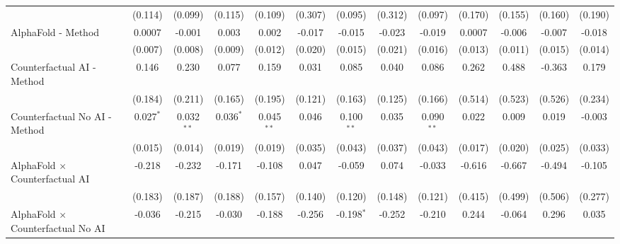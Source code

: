 \begin{tabular}{lcccccccccccc}
                                                              & (0.114)     & (0.099)      & (0.115)     & (0.109)      & (0.307)       & (0.095)       & (0.312)       & (0.097)       & (0.170) & (0.155) & (0.160) & (0.190)\\   
   AlphaFold - Method                                         & 0.0007      & -0.001       & 0.003       & 0.002        & -0.017        & -0.015        & -0.023        & -0.019        & 0.0007  & -0.006  & -0.007  & -0.018\\   
                                                              & (0.007)     & (0.008)      & (0.009)     & (0.012)      & (0.020)       & (0.015)       & (0.021)       & (0.016)       & (0.013) & (0.011) & (0.015) & (0.014)\\   
   Counterfactual AI - Method                                 & 0.146       & 0.230        & 0.077       & 0.159        & 0.031         & 0.085         & 0.040         & 0.086         & 0.262   & 0.488   & -0.363  & 0.179\\   
                                                              & (0.184)     & (0.211)      & (0.165)     & (0.195)      & (0.121)       & (0.163)       & (0.125)       & (0.166)       & (0.514) & (0.523) & (0.526) & (0.234)\\   
   Counterfactual No AI - Method                              & 0.027$^{*}$ & 0.032$^{**}$ & 0.036$^{*}$ & 0.045$^{**}$ & 0.046         & 0.100$^{**}$  & 0.035         & 0.090$^{**}$  & 0.022   & 0.009   & 0.019   & -0.003\\   
                                                              & (0.015)     & (0.014)      & (0.019)     & (0.019)      & (0.035)       & (0.043)       & (0.037)       & (0.043)       & (0.017) & (0.020) & (0.025) & (0.033)\\   
   AlphaFold $\times$ Counterfactual AI                       & -0.218      & -0.232       & -0.171      & -0.108       & 0.047         & -0.059        & 0.074         & -0.033        & -0.616  & -0.667  & -0.494  & -0.105\\   
                                                              & (0.183)     & (0.187)      & (0.188)     & (0.157)      & (0.140)       & (0.120)       & (0.148)       & (0.121)       & (0.415) & (0.499) & (0.506) & (0.277)\\   
   AlphaFold $\times$ Counterfactual No AI                    & -0.036      & -0.215       & -0.030      & -0.188       & -0.256        & -0.198$^{*}$  & -0.252        & -0.210        & 0.244   & -0.064  & 0.296   & 0.035\\   

\end{tabular}

